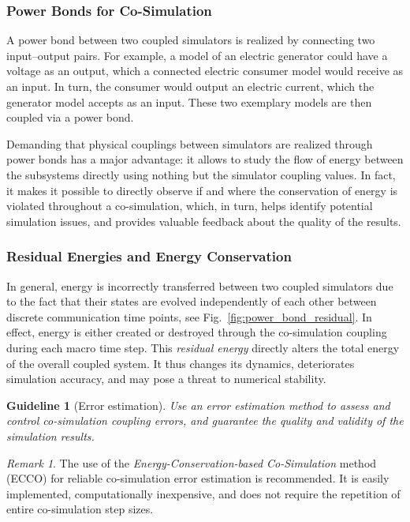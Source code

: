 \documentclass[prb,aps,showpacs,floatfix,twocolumn,10pt]{revtex4-1}
\newcommand{\guidelineErrorestimation}{%
	Use an error estimation method to assess and control co-simulation coupling errors, and guarantee the quality and validity of the simulation results.
}
\theoremstyle{plain}
\newtheorem{guideline}{Guideline}
\theoremstyle{remark}
\newtheorem{remark}{Remark}[guideline]
\begin{document}
\subsubsection{Power Bonds for Co-Simulation}
\label{subsec:interfaces:high-level:power bonds}

A power bond between two coupled simulators is realized by connecting two input--output pairs.
For example, a model of an electric generator could have a voltage as an output, which a connected electric consumer model would receive as an input.
In turn, the consumer would output an electric current, which the generator model accepts as an input.
These two exemplary models are then coupled via a power bond.

Demanding that physical couplings between simulators are realized through power bonds has a major advantage:
it allows to study the flow of energy between the subsystems directly using nothing but the simulator coupling values.
In fact, it makes it possible to directly observe if and where the conservation of energy is violated throughout a co-simulation, which, in turn, helps identify potential simulation issues, and provides valuable feedback about the quality of the results.

\subsubsection{Residual Energies and Energy Conservation}
\label{subsec:interfaces:high-level:residuals}

In general, energy is incorrectly transferred between two coupled simulators due to the fact that their states are evolved independently of each other between discrete communication time points, see Fig.~\ref{fig:power_bond_residual}.
In effect, energy is either created or destroyed through the co-simulation coupling during each macro time step.\cite{Benedikt2013}
This \emph{residual energy} directly alters the total energy of the overall coupled system.\cite{Sadjina2016}
It thus changes its dynamics, deteriorates simulation accuracy, and may pose a threat to numerical stability.

\begin{guideline}[Error estimation]
\label{guideline:Errorestimation}
	\guidelineErrorestimation{}
\end{guideline}

\begin{remark}
	The use of the \emph{Energy-Conservation-based Co-Simulation} method (ECCO) for reliable co-simulation error estimation is recommended.
	It is easily implemented, computationally inexpensive, and does not require the repetition of entire co-simulation step sizes.
\end{remark}
\end{document}

